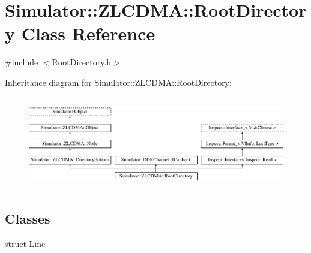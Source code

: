 \hypertarget{class_simulator_1_1_z_l_c_d_m_a_1_1_root_directory}{\section{Simulator\+:\+:Z\+L\+C\+D\+M\+A\+:\+:Root\+Directory Class Reference}
\label{class_simulator_1_1_z_l_c_d_m_a_1_1_root_directory}
}


{\ttfamily \#include $<$Root\+Directory.\+h$>$}

Inheritance diagram for Simulator\+:\+:Z\+L\+C\+D\+M\+A\+:\+:Root\+Directory\+:\begin{figure}[H]
\begin{center}
\leavevmode
\includegraphics[height=4.093567cm]{class_simulator_1_1_z_l_c_d_m_a_1_1_root_directory}
\end{center}
\end{figure}
\subsection*{Classes}
\begin{DoxyCompactItemize}
\item 
struct \hyperlink{struct_simulator_1_1_z_l_c_d_m_a_1_1_root_directory_1_1_line}{Line}
\end{DoxyCompactItemize}
